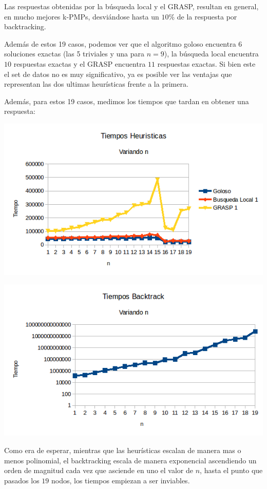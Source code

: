 Las respuestas obtenidas por la búsqueda local y el GRASP, resultan en general, en mucho mejores k-PMPs, desviándose hasta un $10\%$ de la respuesta por backtracking.

Además de estos 19 casos, podemos ver que el algoritmo goloso encuentra $6$ soluciones exactas (las 5 triviales y una para $n = 9$), la búsqueda local encuentra $10$ respuestas exactas y el GRASP encuentra $11$ respuestas exactas. Si bien este el set de datos no es muy significativo, ya es posible ver las ventajas que representan las dos ultimas heurísticas frente a la primera.

Además, para estos 19 casos, medimos los tiempos que tardan en obtener una respuesta:

\includegraphics[scale=0.7]{Con/tiempos1Back.png}

\includegraphics[scale=0.7]{Con/tiempos1Otros.png}

Como era de esperar, mientras que las heurísticas escalan de manera mas o menos polinomial, el backtracking escala de manera exponencial ascendiendo un orden de magnitud cada vez que asciende en uno el valor de $n$, hasta el punto que pasados los $19$ nodos, los tiempos empiezan a ser inviables.

